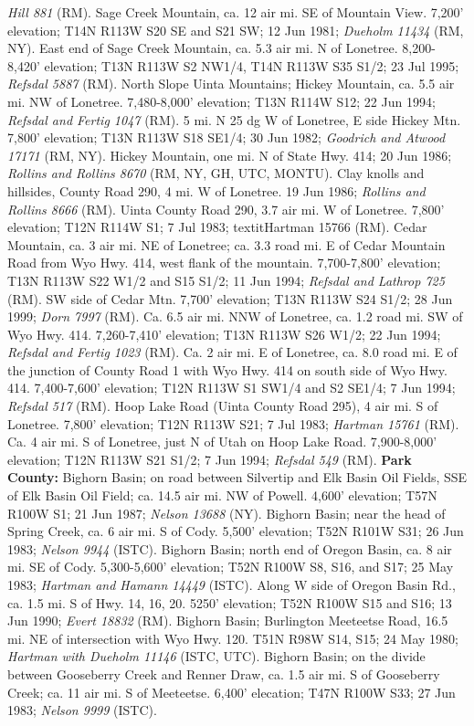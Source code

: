 \textit{Hill 881} (RM).
Sage Creek Mountain, ca. 12 air mi. SE of Mountain View. 7,200' elevation;
T14N R113W S20 SE and S21 SW; 12 Jun 1981; \textit{Dueholm 11434} (RM, NY).
East end of Sage Creek Mountain, ca. 5.3 air mi. N of Lonetree.
8,200-8,420' elevation; T13N R113W S2 NW1/4, T14N R113W S35 S1/2; 23 Jul 1995;
\textit{Refsdal 5887} (RM).
North Slope Uinta Mountains; Hickey Mountain, ca. 5.5 air mi. NW of Lonetree.
7,480-8,000' elevation; T13N R114W S12; 22 Jun 1994;
\textit{Refsdal and Fertig 1047} (RM).
5 mi. N 25 dg W of Lonetree, E side Hickey Mtn. 7,800' elevation;
T13N R113W S18 SE1/4; 30 Jun 1982; \textit{Goodrich and Atwood 17171} (RM, NY).
Hickey Mountain, one mi. N of State Hwy. 414; 20 Jun 1986;
\textit{Rollins and Rollins 8670} (RM, NY, GH, UTC, MONTU).
Clay knolls and hillsides, County Road 290, 4 mi. W of Lonetree. 19 Jun 1986;
\textit{Rollins and Rollins 8666} (RM).
Uinta County Road 290, 3.7 air mi. W of Lonetree. 7,800' elevation;
T12N R114W S1; 7 Jul 1983; textit{Hartman 15766} (RM).
Cedar Mountain, ca. 3 air mi. NE of Lonetree; ca. 3.3 road mi. E of Cedar
Mountain Road from Wyo Hwy. 414, west flank of the mountain.
7,700-7,800' elevation; T13N R113W S22 W1/2 and S15 S1/2; 11 Jun 1994;
\textit{Refsdal and Lathrop 725} (RM).
SW side of Cedar Mtn. 7,700' elevation; T13N R113W S24 S1/2; 28 Jun 1999;
\textit{Dorn 7997} (RM).
Ca. 6.5 air mi. NNW of Lonetree, ca. 1.2 road mi. SW of Wyo Hwy. 414.
7,260-7,410' elevation; T13N R113W S26 W1/2; 22 Jun 1994;
\textit{Refsdal and Fertig 1023} (RM).
Ca. 2 air mi. E of Lonetree, ca. 8.0 road mi. E of the junction of County Road 1
with Wyo Hwy. 414 on south side of Wyo Hwy. 414. 7,400-7,600' elevation;
T12N R113W S1 SW1/4 and S2 SE1/4; 7 Jun 1994; \textit{Refsdal 517} (RM).
Hoop Lake Road (Uinta County Road 295), 4 air mi. S of Lonetree.
7,800' elevation; T12N R113W S21; 7 Jul 1983; \textit{Hartman 15761} (RM).
Ca. 4 air mi. S of Lonetree, just N of Utah on Hoop Lake Road.
7,900-8,000' elevation; T12N R113W S21 S1/2; 7 Jun 1994;
\textit{Refsdal 549} (RM).
  \textbf{Park County:}
Bighorn Basin; on road between Silvertip and Elk Basin Oil Fields, SSE of Elk
Basin Oil Field; ca. 14.5 air mi. NW of Powell. 4,600' elevation;
T57N R100W S1; 21 Jun 1987; \textit{Nelson	13688} (NY).
Bighorn Basin; near the head of Spring Creek, ca. 6 air mi. S of Cody.
5,500' elevation; T52N R101W S31; 26 Jun 1983; \textit{Nelson 9944} (ISTC).
Bighorn Basin; north end of Oregon Basin, ca. 8 air mi. SE of Cody.
5,300-5,600' elevation; T52N R100W S8, S16, and S17; 25 May 1983;
\textit{Hartman and Hamann 14449} (ISTC).
Along W side of Oregon Basin Rd., ca. 1.5 mi. S of Hwy. 14, 16, 20.
5250' elevation; T52N R100W S15 and S16;	13 Jun 1990;
\textit{Evert 18832} (RM).
Bighorn Basin; Burlington Meeteetse Road, 16.5 mi. NE of intersection with
Wyo Hwy. 120. T51N R98W S14, S15; 24 May 1980;
\textit{Hartman with Dueholm 11146} (ISTC, UTC).
Bighorn Basin; on the divide between Gooseberry Creek and Renner Draw, ca.
1.5 air mi. S of Gooseberry Creek; ca. 11 air mi. S of Meeteetse.
6,400' elecation; T47N R100W S33; 27 Jun 1983; \textit{Nelson 9999} (ISTC).

